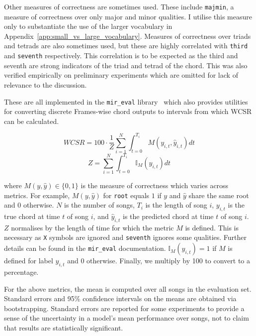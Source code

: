 Other measures of correctness are sometimes used. These include \texttt{majmin}, a measure of correctness over only major and minor qualities. I utilise this measure only to substantiate the use of the larger vocabulary in Appendix~\ref{app:small_vs_large_vocabulary}. Measures of correctness over triads and tetrads are also sometimes used, but these are highly correlated with \texttt{third} and \texttt{seventh} respectively. This correlation is to be expected as the third and seventh are strong indicators of the triad and tetrad of the chord. This was also verified empirically on preliminary experiments which are omitted for lack of relevance to the discussion.

These are all implemented in the \texttt{mir\_eval} library~\citep{mir_eval} which also provides utilities for converting discrete Frames-wise chord outputs to intervals from which WCSR can be calculated.

\begin{equation}\label{eq:wcsr}
    WCSR = 100\cdot\frac{1}{Z}\sum_{i=1}^{N} \int_{t=0}^{T_i} M(y_{i,t},\hat{y}_{i,t}) dt
\end{equation}
\begin{equation}
    Z = \sum_{i=1}^{N} \int_{t=0}^{T_i} \mathbb{I}_M(y_{i,t}) dt
\end{equation}

where $M(y, \hat{y})\in\{0,1\}$ is the measure of correctness which varies across metrics. For example, $M(y, \hat{y})$ for \texttt{root} equals $1$ if $y$ and $\hat{y}$ share the same root and $0$ otherwise. $N$ is the number of songs, $T_i$ is the length of song $i$, $y_{i,t}$ is the true chord at time $t$ of song $i$, and $\hat{y}_{i,t}$ is the predicted chord at time $t$ of song $i$. $Z$ normalises by the length of time for which the metric $M$ is defined. This is necessary as \texttt{X} symbols are ignored and \texttt{seventh} ignores some qualities. Further details can be found in the \texttt{mir\_eval} documentation. $\mathbb{I}_M(y_{i,t})=1$ if $M$ is defined for label $y_{i,t}$ and $0$ otherwise. Finally, we multiply by 100 to convert to a percentage.

For the above metrics, the mean is computed over all songs in the evaluation set. Standard errors and 95\% confidence intervals on the means are obtained via bootstrapping. Standard errors are reported for some experiments to provide a sense of the uncertainty in a model's mean performance over songs, not to claim that results are statistically significant.

